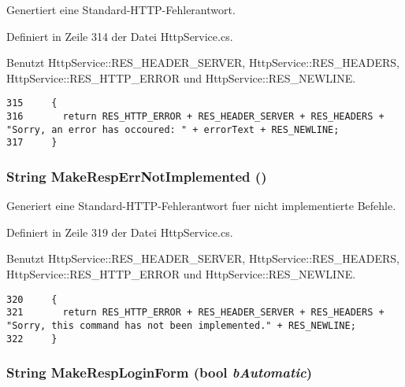 Genertiert eine Standard-HTTP-Fehlerantwort. 



Definiert in Zeile 314 der Datei Http\-Service.cs.

Benutzt Http\-Service::RES\_\-HEADER\_\-SERVER, Http\-Service::RES\_\-HEADERS, Http\-Service::RES\_\-HTTP\_\-ERROR und Http\-Service::RES\_\-NEWLINE.



\footnotesize\begin{verbatim}315     {
316       return RES_HTTP_ERROR + RES_HEADER_SERVER + RES_HEADERS + "Sorry, an error has occoured: " + errorText + RES_NEWLINE;
317     }
\end{verbatim}\normalsize 
\hypertarget{classQbeSAS_1_1HttpService_QbeSAS_1_1HttpServiced4}{
\subsubsection[MakeRespErrNotImplemented]{\setlength{\rightskip}{0pt plus 5cm}String Make\-Resp\-Err\-Not\-Implemented ()}}
\label{classQbeSAS_1_1HttpService_QbeSAS_1_1HttpServiced4}


Generiert eine Standard-HTTP-Fehlerantwort fuer nicht implementierte Befehle. 



Definiert in Zeile 319 der Datei Http\-Service.cs.

Benutzt Http\-Service::RES\_\-HEADER\_\-SERVER, Http\-Service::RES\_\-HEADERS, Http\-Service::RES\_\-HTTP\_\-ERROR und Http\-Service::RES\_\-NEWLINE.



\footnotesize\begin{verbatim}320     {
321       return RES_HTTP_ERROR + RES_HEADER_SERVER + RES_HEADERS + "Sorry, this command has not been implemented." + RES_NEWLINE;
322     }
\end{verbatim}\normalsize 
\hypertarget{classQbeSAS_1_1HttpService_QbeSAS_1_1HttpServiced7}{
\subsubsection[MakeRespLoginForm]{\setlength{\rightskip}{0pt plus 5cm}String Make\-Resp\-Login\-Form (bool {\em b\-Automatic})}}
\label{classQbeSAS_1_1HttpService_QbeSAS_1_1HttpServiced7}




